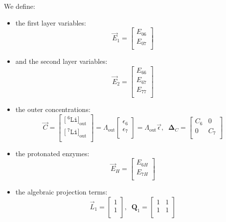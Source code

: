\documentclass[aps,onecolumn,11pt]{revtex4}
\newcommand{\mychem}[1]{\mathtt{#1}}
\newcommand{\myconc}[1]{\big[#1\big]}
\newcommand{\spLi}[1]{{\!~^{#1}\mychem{Li}}}
\newcommand{\Li}[1]{\myconc{\spLi{#1}}}
\newcommand{\myout}[1]{{#1}_{\mathrm{out}}}
\newcommand{\LiOut}[1]{\myout{\Li{#1}}}
\newcommand{\mymat}[1]{{\bm{#1}}}
\newcommand{\LiAll}{\Lambda}
\newcommand{\LiAllOut}{\myout{\LiAll}}
\begin{document}
We define:
\begin{itemize}
\item the first layer variables:
\begin{equation}
	\vec{E}_1 = \begin{bmatrix}
	E_{06}\\
	E_{07}\\
	\end{bmatrix}
\end{equation}
\item and the second layer variables:
\begin{equation}
	\vec{E}_2 = \begin{bmatrix}
	E_{66}\\
	E_{67}\\
	E_{77}\\
	\end{bmatrix}
\end{equation}
\item the outer concentrations:
\begin{equation}
\label{eq:C}
	\vec{C} = 
	\begin{bmatrix}
	\LiOut{6}\\
	\LiOut{7}\\
	\end{bmatrix}
	=
	\LiAllOut
	\begin{bmatrix}
	\epsilon_6\\
	\epsilon_7\\
	\end{bmatrix}
	=
	\LiAllOut\vec{\epsilon},\;\;
	\mymat{\Delta}_C = 
	\begin{bmatrix}
	C_6 & 0\\
	 0& C_7\\
	\end{bmatrix}
\end{equation}
\item the protonated enzymes:
\begin{equation}
	\vec{E}_H = 
	\begin{bmatrix}
	E_{6H}\\
	E_{7H}\\
	\end{bmatrix}
\end{equation}
\item the algebraic projection terms:
\begin{equation}
	\vec{L}_1 = 
	\begin{bmatrix}
	1\\
	1\\
	\end{bmatrix},\;\;
	\mymat{Q}_1 = 
	\begin{bmatrix}
	1&1\\
	1&1\\
	\end{bmatrix}
\end{equation}

\end{itemize}
\end{document}
